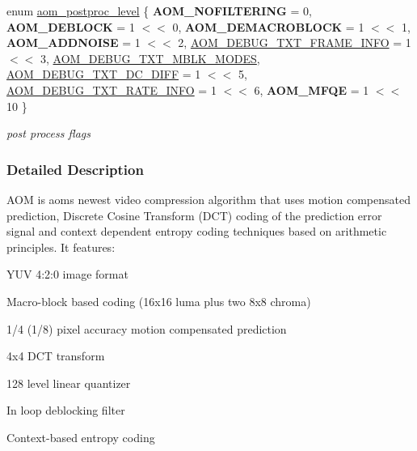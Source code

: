 \begin{DoxyCompactItemize}
\item 
enum \hyperlink{group__aom_gac6080eabf4ec17e97196664eb989cc82}{aom\+\_\+postproc\+\_\+level} \{ \newline
{\bfseries A\+O\+M\+\_\+\+N\+O\+F\+I\+L\+T\+E\+R\+I\+NG} = 0, 
{\bfseries A\+O\+M\+\_\+\+D\+E\+B\+L\+O\+CK} = 1 $<$$<$ 0, 
{\bfseries A\+O\+M\+\_\+\+D\+E\+M\+A\+C\+R\+O\+B\+L\+O\+CK} = 1 $<$$<$ 1, 
{\bfseries A\+O\+M\+\_\+\+A\+D\+D\+N\+O\+I\+SE} = 1 $<$$<$ 2, 
\newline
\hyperlink{group__aom_ggac6080eabf4ec17e97196664eb989cc82a954d7e31134442c20e9d27f0ac9113b8}{A\+O\+M\+\_\+\+D\+E\+B\+U\+G\+\_\+\+T\+X\+T\+\_\+\+F\+R\+A\+M\+E\+\_\+\+I\+N\+FO} = 1 $<$$<$ 3, 
\hyperlink{group__aom_ggac6080eabf4ec17e97196664eb989cc82a7f9333b6fa79f7231ae73e1effafb25b}{A\+O\+M\+\_\+\+D\+E\+B\+U\+G\+\_\+\+T\+X\+T\+\_\+\+M\+B\+L\+K\+\_\+\+M\+O\+D\+ES}, 
\hyperlink{group__aom_ggac6080eabf4ec17e97196664eb989cc82a67340f012436cb0039d3cdc62244ca50}{A\+O\+M\+\_\+\+D\+E\+B\+U\+G\+\_\+\+T\+X\+T\+\_\+\+D\+C\+\_\+\+D\+I\+FF} = 1 $<$$<$ 5, 
\hyperlink{group__aom_ggac6080eabf4ec17e97196664eb989cc82a2ed5c856f44d6de7d5e72aa7f826df56}{A\+O\+M\+\_\+\+D\+E\+B\+U\+G\+\_\+\+T\+X\+T\+\_\+\+R\+A\+T\+E\+\_\+\+I\+N\+FO} = 1 $<$$<$ 6, 
\newline
{\bfseries A\+O\+M\+\_\+\+M\+F\+QE} = 1 $<$$<$ 10
 \}\begin{DoxyCompactList}\small\item\em post process flags \end{DoxyCompactList}
\end{DoxyCompactItemize}


\subsubsection{Detailed Description}
A\+OM is aom\textquotesingle{}s newest video compression algorithm that uses motion compensated prediction, Discrete Cosine Transform (D\+CT) coding of the prediction error signal and context dependent entropy coding techniques based on arithmetic principles. It features\+:
\begin{DoxyItemize}
\item Y\+UV 4\+:2\+:0 image format
\item Macro-\/block based coding (16x16 luma plus two 8x8 chroma)
\item 1/4 (1/8) pixel accuracy motion compensated prediction
\item 4x4 D\+CT transform
\item 128 level linear quantizer
\item In loop deblocking filter
\item Context-\/based entropy coding 
\end{DoxyItemize}


